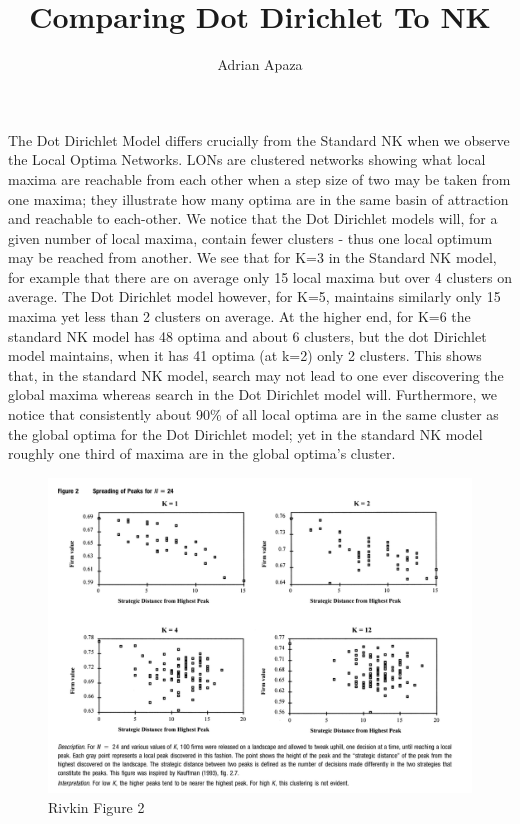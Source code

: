 \documentclass[11pt, oneside]{article}   	%
\title{Comparing Dot Dirichlet To NK}
\author{Adrian Apaza}
\begin{document}
\maketitle

The Dot Dirichlet Model differs crucially from the Standard NK when we observe the Local Optima Networks. LONs are clustered networks showing what local maxima are reachable from each other when a step size of two may be taken from one maxima; they illustrate how many optima are in the same basin of attraction and reachable to each-other. We notice that the Dot Dirichlet models will, for a given number of local maxima, contain fewer clusters - thus one local optimum may be reached from another. We see that for K=3 in the Standard NK model, for example that there are on average only 15 local maxima but over 4 clusters on average. The Dot Dirichlet model however, for K=5, maintains similarly only 15 maxima yet less than 2 clusters on average. At the higher end, for K=6 the standard NK model has 48 optima and about 6 clusters, but the dot Dirichlet model maintains, when it has 41 optima (at k=2) only 2 clusters. This shows that, in the standard NK model, search may not lead to one ever discovering the global maxima whereas search in the Dot Dirichlet model will. Furthermore, we notice that consistently about 90\% of all local optima are in the same cluster as the global optima for the Dot Dirichlet model; yet in the standard NK model roughly one third of maxima are in the global optima's cluster. 


\begin{figure}[h!]
  \caption{Rivkin Figure 2}
  \includegraphics[width=1\textwidth]{Rivkin_Figure.png}
\end{figure}
\end{document}
